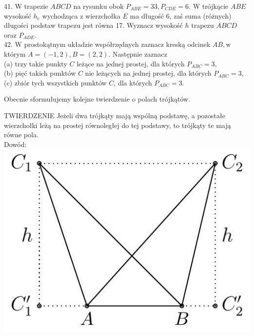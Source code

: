 \documentclass[10pt]{article}
\begin{document}
41. W trapezie \(A B C D\) na rysunku obok \(P_{A B E}=33, P_{C D E}=6\). W trójkącie \(A B E\) wysokość \(h_{e}\) wychodząca z wierzchołka \(E\) ma długość 6, zaś suma (różnych) długości podstaw trapezu jest równa 17. Wyznacz wysokość \(h\) trapezu \(A B C D\) oraz \(P_{A D E}\).\\
42. W prostokątnym układzie współrzędnych zaznacz kreską odcinek \(A B, \mathrm{w}\) którym \(A=(-1,2), B=(2,2)\). Następnie zaznacz\\
(a) trzy takie punkty \(C\) leżące na jednej prostej, dla których \(P_{A B C}=3\),\\
(b) pięć takich punktów \(C\) nie leżących na jednej prostej, dla których \(P_{A B C}=3\),\\
(c) zbiór tych wszystkich punktów \(C\), dla których \(P_{A B C}=3\).

Obecnie sformułujemy kolejne twierdzenie o polach trójkątów.

TWIERDZENIE Jeżeli dwa trójkąty mają wspólną podstawę, a pozostałe wierzchołki leżą na prostej równoległej do tej podstawy, to trójkąty te mają równe pola.\\
Dowód:\\
\includegraphics[max width=\textwidth, center]{2024_11_21_71f62bd117d375398909g-040}
\end{document}
